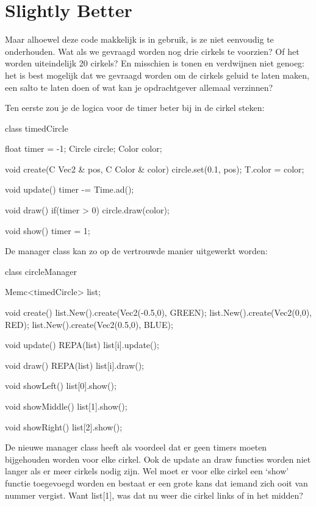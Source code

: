 \section{Slightly Better}
Maar alhoewel deze code makkelijk is in gebruik, is ze niet eenvoudig te onderhouden. Wat als we gevraagd worden nog drie cirkels te voorzien? Of het worden uiteindelijk 20 cirkels? En misschien is tonen en verdwijnen niet genoeg: het is best mogelijk dat we gevraagd worden om de cirkels geluid te laten maken, een salto te laten doen of wat kan je opdrachtgever allemaal verzinnen?

Ten eerste zou je de logica voor de timer beter bij in de cirkel steken:

\begin{code}
class timedCircle  {
  float timer = -1;
  Circle circle;
  Color color;
  
  void create(C Vec2 & pos, C Color & color) {
    circle.set(0.1, pos);
    T.color = color;
  }
  
  void update() {
    timer -= Time.ad();
  }
  
  void draw() {
    if(timer > 0) circle.draw(color);
  }
  
  void show() {
    timer = 1;
  }
}
\end{code}

De manager class kan zo op de vertrouwde manier uitgewerkt worden:

\begin{code}
class circleManager {
  Memc<timedCircle> list;
  
  void create() {
    list.New().create(Vec2(-0.5,0), GREEN);
    list.New().create(Vec2(0,0), RED);
    list.New().create(Vec2(0.5,0), BLUE);
  }
  
  void update() {
    REPA(list) list[i].update();
  }
  
  void draw() {
    REPA(list) list[i].draw();
  }
  
  void showLeft() {
    list[0].show();
  }
  
  void showMiddle() {
    list[1].show();
  }
  
  void showRight() {
    list[2].show();
  }
}
\end{code}

De nieuwe manager class heeft als voordeel dat er geen timers moeten bijgehouden worden voor elke cirkel. Ook de update an draw functies worden niet langer als er meer cirkels nodig zijn. Wel moet er voor elke cirkel een `show' functie toegevoegd worden en bestaat er een grote kans dat iemand zich ooit van nummer vergist. Want list[1], was dat nu weer die cirkel links of in het midden?

